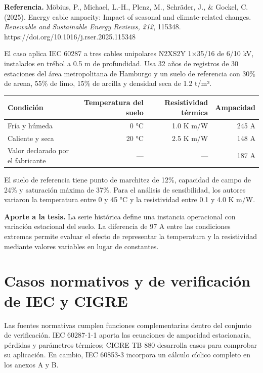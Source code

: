 \documentclass[11pt,a4paper,oneside]{report}
\newcounter{none}
\begin{document}
\textbf{Referencia.} Möbius, P., Michael, L.-H., Plenz, M., Schräder,
J., \& Gockel, C. (2025). Energy cable ampacity: Impact of seasonal and
climate-related changes. \emph{Renewable and Sustainable Energy Reviews,
212}, 115348. https://doi.org/10.1016/j.rser.2025.115348

El caso aplica IEC 60287 a tres cables unipolares N2XS2Y 1×35/16 de 6/10
kV, instalados en trébol a 0.5 m de profundidad. Usa 32 años de
registros de 30 estaciones del área metropolitana de Hamburgo y un suelo
de referencia con 30\% de arena, 55\% de limo, 15\% de arcilla y
densidad seca de 1.2 t/m³.

{\def\LTcaptype{none} %
\begin{longtable}[]{@{}lrrr@{}}
\toprule\noalign{}
Condición & Temperatura del suelo & Resistividad térmica & Ampacidad \\
\midrule\noalign{}
\endhead
\bottomrule\noalign{}
\endlastfoot
Fría y húmeda & 0 °C & 1.0 K m/W & 245 A \\
Caliente y seca & 20 °C & 2.5 K m/W & 148 A \\
Valor declarado por el fabricante & --- & --- & 187 A \\
\end{longtable}
}

El suelo de referencia tiene punto de marchitez de 12\%, capacidad de
campo de 24\% y saturación máxima de 37\%. Para el análisis de
sensibilidad, los autores variaron la temperatura entre 0 y 45 °C y la
resistividad entre 0.1 y 4.0 K m/W.

\textbf{Aporte a la tesis.} La serie histórica define una instancia
operacional con variación estacional del suelo. La diferencia de 97 A
entre las condiciones extremas permite evaluar el efecto de representar
la temperatura y la resistividad mediante valores variables en lugar de
constantes.

\section{Casos normativos y de verificación de IEC y
CIGRE}\label{casos-normativos-y-de-verificaciuxf3n-de-iec-y-cigre}

Las fuentes normativas cumplen funciones complementarias dentro del
conjunto de verificación. IEC 60287-1-1 aporta las ecuaciones de
ampacidad estacionaria, pérdidas y parámetros térmicos; CIGRE TB 880
desarrolla casos para comprobar su aplicación. En cambio, IEC 60853-3
incorpora un cálculo cíclico completo en los anexos A y B.
\end{document}
